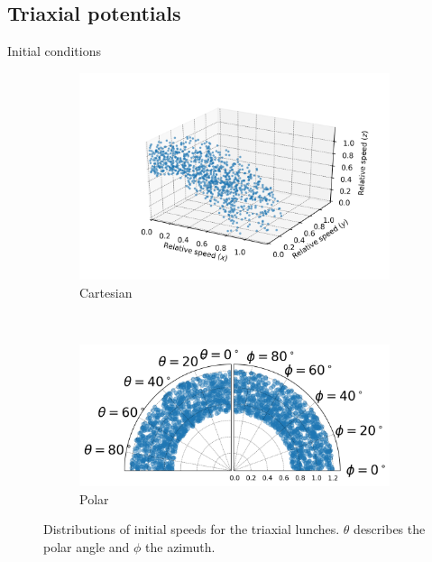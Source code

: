 \documentclass[handout]{beamer}
\begin{document}
\subsection{Triaxial potentials}
\begin{frame}{Initial conditions}
	\begin{figure}[h]
		\centering
		\begin{subfigure}[b]{0.475\textwidth}
			\includegraphics[width = \textwidth]{"../Files/Week 13/3d_initial_speeds"}
			\caption{Cartesian}
		\end{subfigure}
		~ 
		\begin{subfigure}[b]{0.475\textwidth}
			\includegraphics[width=\textwidth]{"../Files/Week 13/polar_initial_speeds_slides"}
			\caption{Polar}
		\end{subfigure}
		\caption{Distributions of initial speeds for the triaxial lunches. $\theta$ describes the polar angle and $\phi$ the azimuth.}
		\label{fig: initialSpeedDistributions}
	\end{figure}
\end{frame}
\end{document}

